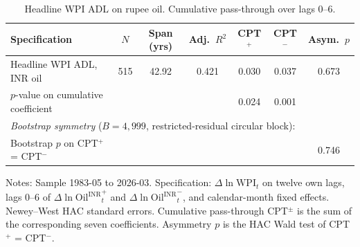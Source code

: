 \begin{table}[t]
\centering
\caption{Headline WPI ADL on rupee oil. Cumulative pass-through over lags 0--6.}
\label{tab:wpi}
\footnotesize
\setlength{\tabcolsep}{5pt}
\begin{threeparttable}
\begin{tabular}{l c c c c c c}
\toprule
Specification & $N$ & Span (yrs) & Adj.\ $R^2$ & CPT$^+$ & CPT$^-$ & Asym.\ $p$ \\
\midrule
Headline WPI ADL, INR oil & 515 & 42.92 & 0.421 & 0.030 & 0.037 & 0.673 \\
$p$-value on cumulative coefficient & & & & 0.024 & 0.001 & \\
\midrule
\multicolumn{7}{l}{\emph{Bootstrap symmetry} ($B = 4{,}999$, restricted-residual circular block):} \\
Bootstrap $p$ on CPT$^+$ = CPT$^-$ & & & & & & 0.746 \\
\bottomrule
\end{tabular}
\begin{tablenotes}\footnotesize
\item Notes: Sample 1983-05 to 2026-03. Specification: $\Delta \ln \mathrm{WPI}_t$ on twelve own lags, lags 0--6 of $\Delta \ln \mathrm{Oil^{INR}}_t^{+}$ and $\Delta \ln \mathrm{Oil^{INR}}_t^{-}$, and calendar-month fixed effects. Newey--West HAC standard errors. Cumulative pass-through CPT$^\pm$ is the sum of the corresponding seven coefficients. Asymmetry $p$ is the HAC Wald test of CPT$^+$ = CPT$^-$.
\end{tablenotes}
\end{threeparttable}
\end{table}
